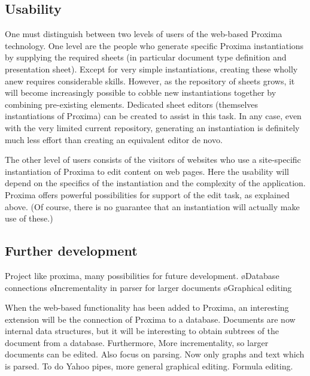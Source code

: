 \documentclass[10pt]{article}
\begin{document}
\subsection{Usability}

One must distinguish between two levels of users of the web-based Proxima technology. One level are the people who generate specific Proxima instantiations by supplying the required sheets (in particular document type definition and presentation sheet). Except for very simple instantiations, creating these wholly anew requires considerable skills. However, as the repository of sheets grows, it will become increasingly possible to cobble new instantiations together by combining pre-existing elements.  Dedicated sheet editors (themselves instantiations of Proxima) can be created to assist in this task.  In any case, even with the very limited current repository, generating an instantiation is definitely much less effort than creating an equivalent editor de novo.

The other level of users consists of the visitors of websites who use a site-specific instantiation of Proxima to edit content on web pages. Here the usability will depend on the specifics of the instantiation and the complexity of the application.  Proxima offers powerful possibilities for support of the edit task, as explained above. (Of course, there is no guarantee that an instantiation will actually make use of these.)






\subsection{Further development}

Project like proxima, many possibilities for future development.
\bl
\o Database connections
\o Incrementality in parser for larger documents
\o Graphical editing
\el

When the web-based functionality has been added to Proxima, an interesting extension will be the connection of Proxima to a database. Documents are now internal data structures, but it will be interesting to obtain subtrees of the document from a database. Furthermore, More incrementality, so larger documents can be edited. Also focus on parsing. Now only graphs and text which is parsed. To do Yahoo pipes, more general graphical editing. Formula editing.
\end{document}
